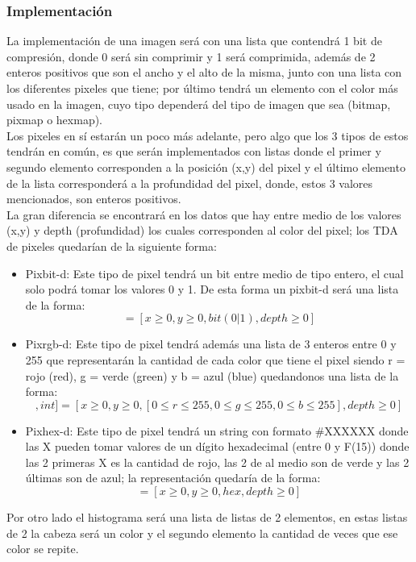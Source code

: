   \subsubsection{Implementación}
    La implementación de una imagen será con una lista que contendrá 1 bit de compresión, donde 0 será sin comprimir 
    y 1 será comprimida, además de 2 enteros positivos que son el ancho y el alto de la misma, junto
    con una lista con los diferentes pixeles que tiene; por último tendrá un elemento con el color más
    usado en la imagen, cuyo tipo dependerá del tipo de imagen que sea (bitmap, pixmap o hexmap).\\

    Los pixeles en sí estarán un poco más adelante, pero algo que los 3 tipos de estos tendrán en común, es que serán implementados con listas 
    donde el primer y segundo elemento corresponden a la posición (x,y) del pixel y el último elemento de la lista
    corresponderá a la profundidad del pixel, donde, estos 3 valores mencionados, son enteros positivos.\\

    La gran diferencia se encontrará en los datos que hay entre medio de los valores (x,y) y depth (profundidad)
    los cuales corresponden al color del pixel; los TDA de pixeles quedarían de la siguiente forma:
    \begin{itemize}
        \item Pixbit-d: Este tipo de pixel tendrá un bit entre medio de tipo entero, el cual solo podrá 
        tomar los valores 0 y 1. De esta forma un pixbit-d será una lista de la forma:
        \begin{equation*}
            [int, int, int, int] = [x \geq 0, y \geq 0, bit(0|1), depth \geq 0]
        \end{equation*}
        
        \item Pixrgb-d: Este tipo de pixel tendrá además una lista de 3 enteros entre 0 y 255 que representarán la 
        cantidad de cada color que tiene el pixel siendo r = rojo (red), g = verde (green) y b = azul (blue)
        quedandonos una lista de la forma:
        \begin{equation*}
            [int, int, [int, int, int], int] = [x \geq 0, y \geq 0, [0 \leq r \leq 255, 0 \leq g \leq 255, 0 \leq b \leq 255], depth \geq 0]
        \end{equation*}
        
        \item Pixhex-d: Este tipo de pixel tendrá un string con formato \#XXXXXX donde las X pueden tomar valores de un dígito hexadecimal (entre 0 y F(15))
        donde las 2 primeras X es la cantidad de rojo, las 2 de al medio son de verde y las 2 últimas son de azul; la representación quedaría de la forma:
        \begin{equation*}
            [int, int, string, int] = [x \geq 0, y \geq 0, hex, depth \geq 0]
        \end{equation*}
    \end{itemize}

    Por otro lado el histograma será una lista de listas de 2 elementos, en estas listas de 2 la cabeza será un color
    y el segundo elemento la cantidad de veces que ese color se repite.
